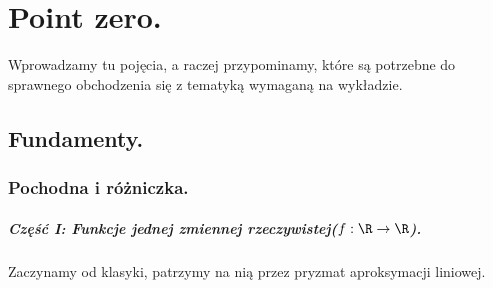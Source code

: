 \chapter{Point zero.}
Wprowadzamy tu pojęcia, a raczej przypominamy, które są potrzebne do sprawnego obchodzenia się z tematyką wymaganą na wykładzie.
\section{Fundamenty.}
\subsection{Pochodna i różniczka.}

\paragraph{Część I: Funkcje jednej zmiennej rzeczywistej($f:\R \to \R$).}
Zaczynamy od klasyki, patrzymy na nią przez pryzmat aproksymacji liniowej.
